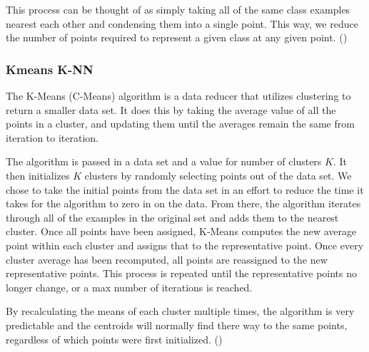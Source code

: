 \documentclass[twoside,11pt]{article}
\begin{document}
This process can be thought of as simply taking all of the same class examples nearest each other and condensing them into a single point. This way, we reduce the number of points required to represent a given class at any given point. (\cite{Condensed})

\subsubsection{Kmeans K-NN}

The K-Means (C-Means) algorithm is a data reducer that utilizes clustering to return a smaller data set. It does this by taking the average value of all the points in a cluster, and updating them until the averages remain the same from iteration to iteration.

 The algorithm is passed in a data set and a value for number of clusters $K$. It then initializes $K$ clusters by randomly selecting points out of the data set. We chose to take the initial points from the data set in an effort to reduce the time it takes for the algorithm to zero in on the data. From there, the algorithm iterates through all of the examples in the original set and adds them to the nearest cluster. Once all points have been assigned, K-Means computes the new average point within each cluster and assigns that to the representative point. Once every cluster average has been recomputed, all points are reassigned to the new representative points. This process is repeated until the representative points no longer change, or a max number of iterations is reached.

By recalculating the means of each cluster multiple times, the algorithm is very predictable and the centroids will normally find there way to the same points, regardless of which points were first initialized. (\cite{CMeans})
\end{document}
